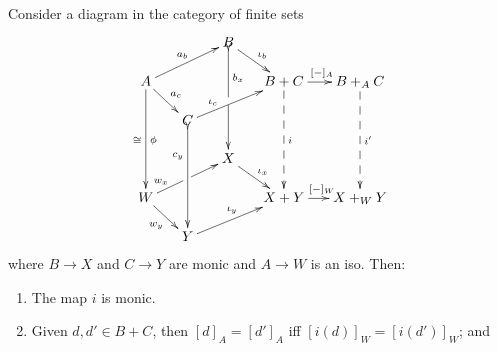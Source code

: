\documentclass[12pt]{article}
\renewcommand{\(}{\left(}
\renewcommand{\)}{\right)}
\renewcommand{\{}{\left\lbrace}
\renewcommand{\}}{\right\rbrace}
\theoremstyle{remark}
\theoremstyle{definition}
\begin{document}
Consider a diagram in the category of finite sets
\begin{equation} \label{Diag:Lemma}
	\xymatrix@C=.2in@R=.2in{
		{} &
		{} &
		{B}
			\ar@{>->}[ddd]^(.3){b_x}|\hole
			\ar[dr]^{\iota_b} &
		{} &
		{} \\
		{A} 
			\ar[ddd]_{\cong}^{\phi}
			\ar[dr]^{a_c}
			\ar[urr]^{a_b} &
		{} &
		{} &
		{B+C} 
			\ar@{-->}[ddd]^{i}
			\ar[r]^{[-]_A} &
		{B+_A C} 
			\ar@{-->}[ddd]^{i'} \\
		{} &
		{C} 
			\ar@{>->}[ddd]_(.3){c_y}
			\ar[urr]^(.3){\iota_c} &
		{} &
		{} &
		{} \\
		{} &
		{} &
		{X} 
			\ar[dr]^{\iota_x} &
		{} &
		{} \\
		{W} 
			\ar[dr]_{w_y}
			\ar[urr]^(.25){w_x}|\hole &
		{} &
		{} &
		{X+Y} 
			\ar[r]^{[-]_W} &
		{X+_WY} \\
		{} &
		{Y} 
			\ar[urr]^{\iota_y} &
		{} &
		{} &
		{} \\
	}
\end{equation}
where $B \to X$ and $C \to Y$ are monic and $A \to W$ is an iso. Then:
\begin{enumerate}
	\item The map $i$ is monic. \label{Lem:Claim1}
	\item Given $d,d' \in B+C$, then $[d]_A = [d']_A$ iff $[i(d)]_W = [i(d')]_W$; and \label{Lem:Claim2}
\end{enumerate} 
\end{document}

